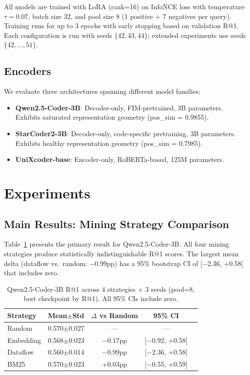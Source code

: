 \documentclass[11pt,a4paper]{article}
\begin{document}
All models are trained with LoRA (rank=16) on InfoNCE loss with temperature $\tau=0.07$, batch size 32, and pool size 8 (1 positive + 7 negatives per query).
Training runs for up to 3 epochs with early stopping based on validation R@1.
Each configuration is run with seeds $\{42, 43, 44\}$; extended experiments use seeds $\{42, \ldots, 51\}$.

\subsection{Encoders}

We evaluate three architectures spanning different model families:
\begin{itemize}
    \item \textbf{Qwen2.5-Coder-3B}: Decoder-only, FIM-pretrained, 3B parameters. Exhibits saturated representation geometry (pos\_sim = 0.9855).
    \item \textbf{StarCoder2-3B}: Decoder-only, code-specific pretraining, 3B parameters. Exhibits healthy representation geometry (pos\_sim = 0.7985).
    \item \textbf{UniXcoder-base}: Encoder-only, RoBERTa-based, 125M parameters.
\end{itemize}

\section{Experiments}

\subsection{Main Results: Mining Strategy Comparison}

Table~\ref{tab:qwen_main} presents the primary result for Qwen2.5-Coder-3B.
All four mining strategies produce statistically indistinguishable R@1 scores.
The largest mean delta (dataflow vs.\ random: $-$0.99pp) has a 95\% bootstrap CI of [$-$2.36, +0.58] that includes zero.

\begin{table}[t]
\centering
\small
\begin{tabular}{lcccc}
\toprule
Strategy & Mean$\pm$Std & $\Delta$ vs Random & 95\% CI \\
\midrule
Random & 0.570$\pm$0.027 & --- & --- \\
Embedding & 0.568$\pm$0.023 & $-$0.17pp & [$-$0.92, +0.58] \\
Dataflow & 0.560$\pm$0.014 & $-$0.99pp & [$-$2.36, +0.58] \\
BM25 & 0.570$\pm$0.023 & +0.03pp & [$-$0.55, +0.59] \\
\bottomrule
\end{tabular}
\caption{Qwen2.5-Coder-3B R@1 across 4 strategies $\times$ 3 seeds (pool=8, best checkpoint by R@1). All 95\% CIs include zero.}
\label{tab:qwen_main}
\end{table}
\end{document}
